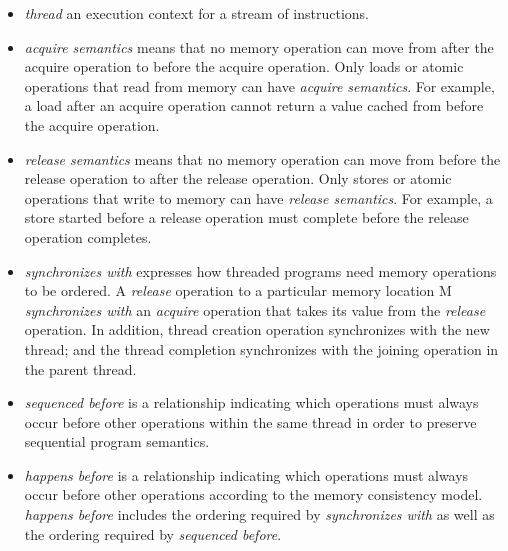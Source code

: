 \begin{itemize}

  \item \textit{thread} an execution context for a stream of instructions.

  \item \textit{acquire semantics} means that no memory operation can move
  from after the acquire operation to before the acquire operation.  Only
  loads or atomic operations that read from memory can have
  \textit{acquire semantics}.  For example, a load after an acquire
  operation cannot return a value cached from before the acquire
  operation.

  \item \textit{release semantics} means that no memory operation can move
  from before the release operation to after the release operation.  Only
  stores or atomic operations that write to memory can have
  \textit{release semantics}.  For example, a store started before a
  release operation must complete before the release operation completes.

  \item \textit{synchronizes with} expresses how threaded programs need
  memory operations to be ordered. A \textit{release} operation to a particular
  memory location M \textit{synchronizes with} an \textit{acquire} operation
  that takes its value from the \textit{release} operation. In addition, thread
  creation operation synchronizes with the new thread; and the thread
  completion synchronizes with the joining operation in the parent thread.

  \item \textit{sequenced before} is a relationship indicating which operations
  must always occur before other operations within the same thread in order to
  preserve sequential program semantics.

  \item \textit{happens before} is a relationship indicating which operations
  must always occur before other operations according to the memory consistency
  model. \textit{happens before} includes the ordering required by
  \textit{synchronizes with} as well as the ordering required by
  \textit{sequenced before}.

\end{itemize}
 
